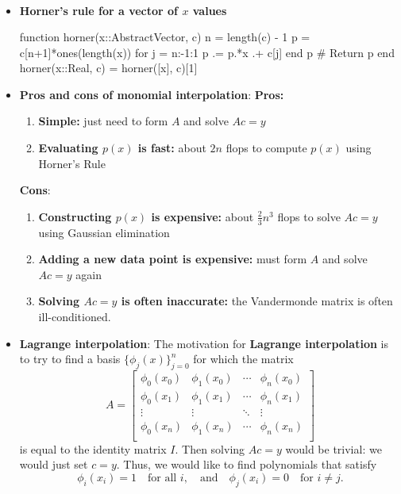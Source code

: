 \documentclass{report}
\begin{document}
\begin{itemize}
\begin{align*}
\end{align*}
\item \textbf{Horner's rule for a vector of $x$ values}
    \bigbreak \noindent 
    \begin{jlcode}
function horner(x::AbstractVector, c)
    n = length(c) - 1
    p = c[n+1]*ones(length(x))
    for j = n:-1:1
        p .= p.*x .+ c[j]
    end
    p # Return p
end
horner(x::Real, c) = horner([x], c)[1]
    \end{jlcode}
\item \textbf{Pros and cons of monomial interpolation}:
    \textbf{Pros:}
    \begin{enumerate}
        \item \textbf{Simple:} just need to form $A$ and solve $Ac = y$
        \item \textbf{Evaluating $p(x)$ is fast:} about $2n$ flops to compute $p(x)$ using Horner's Rule
    \end{enumerate}
\textbf{Cons}:
\begin{enumerate}
    \item \textbf{Constructing $p(x)$ is expensive:} about $\frac{2}{3}n^3$ flops to solve $Ac = y$ using Gaussian elimination
    \item \textbf{Adding a new data point is expensive:} must form $A$ and solve $Ac = y$ again
    \item \textbf{Solving $Ac = y$ is often inaccurate:} the Vandermonde matrix is often ill-conditioned.
\end{enumerate}
\item \textbf{Lagrange interpolation}:
    The motivation for \textbf{Lagrange interpolation} is to try to find a basis $\{\phi_j(x)\}_{j=0}^n$ for which the matrix
    $$
    A = 
    \begin{bmatrix}
        \phi_0(x_0) & \phi_1(x_0) & \cdots & \phi_n(x_0)\\
        \phi_0(x_1) & \phi_1(x_1) & \cdots & \phi_n(x_1)\\
        \vdots & \vdots & \ddots & \vdots\\
        \phi_0(x_n) & \phi_1(x_n) & \cdots & \phi_n(x_n)\\
    \end{bmatrix}
    $$
    is equal to the identity matrix $I$. Then solving $Ac = y$ would be trivial: we would just set $c = y$.
    \bigbreak \noindent 
    Thus, we would like to find polynomials that satisfy
    $$
    \phi_i(x_i) = 1 \quad \text{for all } i, \quad \text{and} \quad \phi_j(x_i) = 0 \quad \text{for } i \neq j.
$$
\end{itemize}
\end{document}

